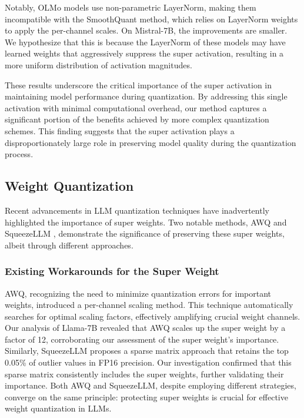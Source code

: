 \documentclass{article} %
\begin{document}
Notably, OLMo models use non-parametric LayerNorm, making them incompatible with the SmoothQuant method, which relies on LayerNorm weights to apply the per-channel scales. On Mistral-7B, the improvements are smaller. We hypothesize that this is because the LayerNorm of these models may have learned weights that aggressively suppress the super activation, resulting in a more uniform distribution of activation magnitudes.

These results underscore the critical importance of the super activation in maintaining model performance during quantization. By addressing this single activation with minimal computational overhead, our method captures a significant portion of the benefits achieved by more complex quantization schemes. This finding suggests that the super activation plays a disproportionately large role in preserving model quality during the quantization process.

\subsection{Weight Quantization}

Recent advancements in LLM quantization techniques have inadvertently highlighted the importance of super weights. Two notable methods, AWQ \citep{lin2024awq} and SqueezeLLM \citep{kim2024squeezellm}, demonstrate the significance of preserving these super weights, albeit through different approaches.

\subsubsection{Existing Workarounds for the Super Weight}

AWQ, recognizing the need to minimize quantization errors for important weights, introduced a per-channel scaling method. This technique automatically searches for optimal scaling factors, effectively amplifying crucial weight channels. Our analysis of Llama-7B revealed that AWQ scales up the super weight by a factor of 12, corroborating our assessment of the super weight's importance.
Similarly, SqueezeLLM proposes a sparse matrix approach that retains the top 0.05\% of outlier values in FP16 precision. Our investigation confirmed that this sparse matrix consistently includes the super weights, further validating their importance. Both AWQ and SqueezeLLM, despite employing different strategies, converge on the same principle: protecting super weights is crucial for effective weight quantization in LLMs.
\end{document}
